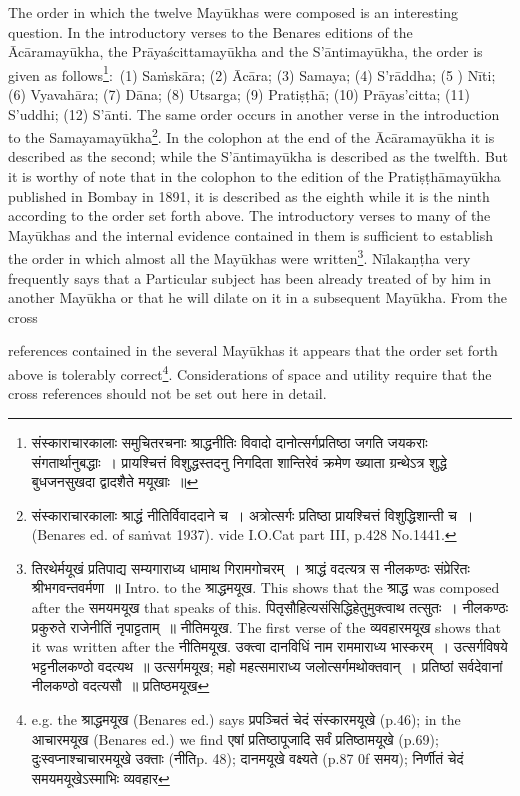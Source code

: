 \documentclass[11pt, openany]{book}
\begin{document}
The order in which the twelve Mayūkhas were composed is an interesting question. In the introductory verses to the Benares editions of the Ācāramayūkha, the Prāyaścittamayūkha and the S'āntimayūkha, the order is given as follows\renewcommand{\thefootnote}{1}\footnote{संस्काराचारकालाः समुचितरचनाः श्राद्धनीतिः विवादो दानोत्सर्गप्रतिष्ठा जगति जयकराः संगतार्थानुबद्धाः~। प्रायश्चित्तं विशुद्धस्तदनु निगदिता शान्तिरेवं क्रमेण ख्याता ग्रन्थेऽत्र शुद्धे बुधजनसुखदा द्वादशैते मयूखाः~॥}:\textendash\ (1) Saṁskāra; (2) Ācāra; (3) Samaya; (4) S'rāddha; (5 ) Nīti; (6) Vyavahāra; (7) Dāna; (8) Utsarga; (9) Pratiṣṭhā; (10) Prāyas'citta; (11) S'uddhi; (12) S'ānti. The same order occurs in another verse in the introduction to the Samayamayūkha\renewcommand{\thefootnote}{2}\footnote{संस्काराचारकालाः श्राद्धं नीतिर्विवाददाने च~। अत्रोत्सर्गः प्रतिष्ठा प्रायश्चित्तं विशुद्धिशान्ती च~। (Benares ed. of saṁvat 1937). vide I.O.Cat part III, p.428 No.1441.}. In the colophon at the end of the Ācāramayūkha it is described as the second; while the S'āntimayūkha is described as the twelfth. But it is worthy of note that in the colophon to the edition of the Pratiṣṭhāmayūkha published in Bombay in 1891, it is described as the eighth while it is the ninth according to the order set forth above. The introductory verses to many of the Mayūkhas and the internal evidence contained in them is sufficient to establish the order in which almost all the Mayūkhas were written\renewcommand{\thefootnote}{3}\footnote{तिरथेर्मयूखं प्रतिपाद्य सम्यगाराध्य धामाथ गिरामगोचरम्~। श्राद्धं वदत्यत्र स नीलकण्ठः संप्रेरितः श्रीभगवन्तवर्मणा~॥ Intro. to the श्राद्धमयूख. This shows that the श्राद्ध was composed after the समयमयूख that speaks of this. पितृसौहित्यसंसिद्धिहेतुमुक्त्वाथ तत्सुतः~। नीलकण्ठः प्रकुरुते राजेनीतिं नृपाट्टताम्~॥ नीतिमयूख. The first verse of the व्यवहारमयूख shows that it was written after the नीतिमयूख. उक्त्वा दानविधिं नाम राममाराध्य भास्करम्~। उत्सर्गविषये भट्टनीलकण्ठो वदत्यथ~॥ उत्सर्गमयूख; महो महत्समाराध्य जलोत्सर्गमथोक्तवान्~। प्रतिष्ठां सर्वदेवानां नीलकण्ठो वदत्यसौ~॥ प्रतिष्ठमयूख\textendash }. Nīlakaṇṭha very frequently says that a Particular subject has been already treated of by him in another Mayūkha or that he will dilate on it in a subsequent Mayūkha. From the cross

\newpage

\noindent
references contained in the several Mayūkhas it appears that the order set forth above is tolerably correct\renewcommand{\thefootnote}{1}\footnote{e.g. the श्राद्धमयूख (Benares ed.) says {\qt प्रपञ्चितं चेदं संस्कारमयूखे} (p.46); in the आचारमयूख (Benares ed.) we find {\qt एषां प्रतिष्ठापूजादि सर्वं प्रतिष्ठामयूखे} (p.69); दुःस्वप्नाश्चाचारमयूखे उक्ताः (नीतिp. 48); {\qt दानमयूखे वक्ष्यते} (p.87 0f समय); {\qt निर्णीतं चेदं समयमयूखेऽस्माभिः} व्यवहार}. Considerations of space and utility require that the cross references should not be set out here in detail.
\end{document}
